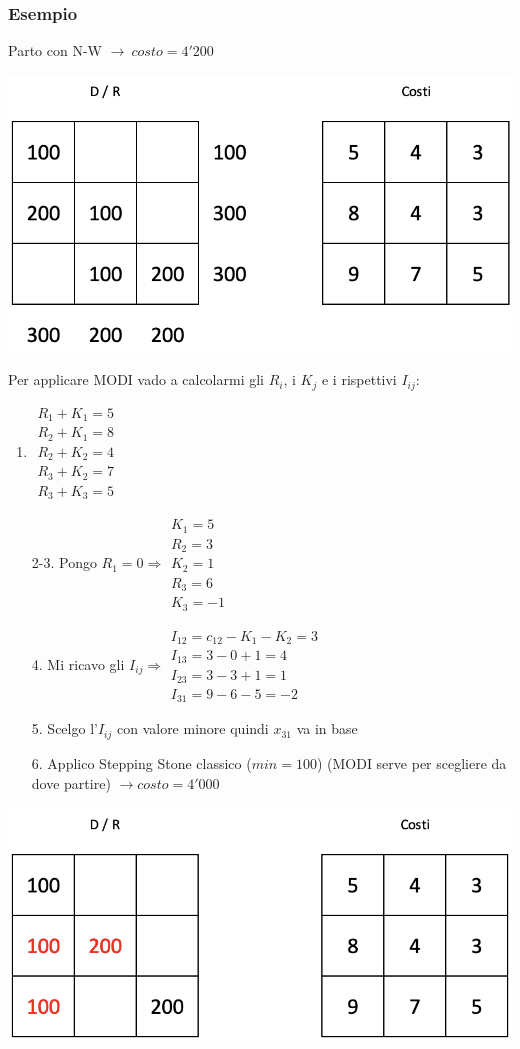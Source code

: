 \documentclass[12pt,a4paper]{article}
\begin{document}
\subsubsection{Esempio}
Parto con N-W $\rightarrow\ costo = 4'200$
\begin{center}
\includegraphics[width=0.4\columnwidth]{img/pb_trasporto_nw.png}
\end{center}
Per applicare MODI vado a calcolarmi gli $R_i$, i $K_j$ e i rispettivi $I_{ij}$:
\begin{enumerate}
\item $\begin{array}{l}R_1+K_1=5\\R_2+K_1=8\\R_2+K_2=4\\R_3+K_2=7\\R_3+K_3=5\end{array}$
\item[2-3.]Pongo $R_1=0 \Rightarrow \begin{array}{l}K_1=5\\R_2=3\\K_2=1\\R_3=6\\K_3=-1 \end{array}$
\item[4.]Mi ricavo gli $I_{ij} \Rightarrow \begin{array}{l}I_{12}=c_{12}-K_1-K_2 = 3\\I_{13}=3-0+1 = 4\\I_{23}=3-3+1 = 1\\I_{31}=9-6-5 = -2\end{array}$
\item[5.] Scelgo l'$I_{ij}$ con valore minore quindi $x_{31}$ va in base
\item[6.] Applico Stepping Stone classico ($min =100$) (MODI serve per scegliere da dove partire) $\rightarrow costo = 4'000$
\end{enumerate}
\begin{center}
\includegraphics[width=0.4\columnwidth]{img/pb_trasporto_modi.png}
\end{center}
\end{document}
